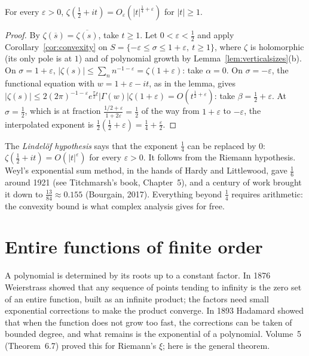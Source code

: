 \begin{theorem}\label{thm:convexzeta}
For every $\varepsilon>0$, $\zeta(\frac12+it)=O_\varepsilon(|t|^{\frac14+\varepsilon})$ for $|t|\ge1$.
\end{theorem}
\begin{proof}
By $\zeta(\overline s)=\overline{\zeta(s)}$, take $t\ge1$. Let $0<\varepsilon<\frac12$ and apply Corollary~\ref{cor:convexity} on $S=\{-\varepsilon\le\sigma\le1+\varepsilon,\ t\ge1\}$, where $\zeta$ is holomorphic (its only pole is
at $1$) and of polynomial growth by Lemma~\ref{lem:verticalsizes}(b). On $\sigma=1+\varepsilon$, $|\zeta(s)|\le\sum_nn^{-1-\varepsilon}=\zeta(1+\varepsilon)$: take $\alpha=0$. On $\sigma=-\varepsilon$, the functional equation with
$w=1+\varepsilon-it$, as in the lemma, gives $|\zeta(s)|\le2(2\pi)^{-1-\varepsilon}e^{\frac\pi2t}|\Gamma(w)|\zeta(1+\varepsilon)=O(t^{\frac12+\varepsilon})$: take $\beta=\frac12+\varepsilon$. At $\sigma=\frac12$, which is at fraction
$\frac{1/2+\varepsilon}{1+2\varepsilon}=\frac12$ of the way from $1+\varepsilon$ to $-\varepsilon$, the interpolated exponent is $\frac12(\frac12+\varepsilon)=\frac14+\frac\varepsilon2$.
\end{proof}

\begin{remark}
The \emph{Lindel\"of hypothesis} says that the exponent $\frac14$ can be replaced by $0$: $\zeta(\frac12+it)=O(|t|^\varepsilon)$ for every $\varepsilon>0$. It follows from the Riemann hypothesis. Weyl's
exponential sum method, in the hands of Hardy and Littlewood, gave $\frac16$ around 1921 (see Titchmarsh's book, Chapter~5), and a century of work brought it down to $\frac{13}{84}\approx0.155$ (Bourgain, 2017). Everything beyond
$\frac14$ requires arithmetic: the convexity bound is what complex analysis gives for free.
\end{remark}

\section{Entire functions of finite order}

A polynomial is determined by its roots up to a constant factor. In 1876 Weierstrass showed that any sequence of points tending to infinity is the zero set of an entire function, built as an
infinite product; the factors need small exponential corrections to make the product converge. In 1893 Hadamard showed that when the function does not grow too fast, the corrections can be
taken of bounded degree, and what remains is the exponential of a polynomial. Volume~5 (Theorem~6.7) proved this for Riemann's $\xi$; here is the general theorem.

